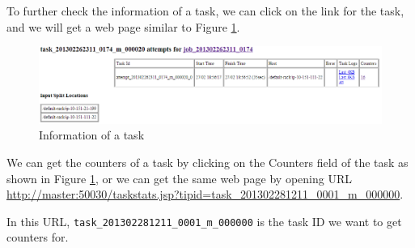 To further check the information of a task, we can click on the link for the task, and we will get a web page similar to Figure \ref{fig:task.info}.
\begin{figure}[ht]
  \centering
  \includegraphics[width=.7\textwidth]{figs/5163os_04_04.png}
  \caption{Information of a task}\label{fig:task.info}
\end{figure} 
We can get the counters of a task by clicking on the Counters field of the task as shown in Figure \ref{fig:task.info}, or we can get the same web page by opening URL \url{http://master:50030/taskstats.jsp?tipid=task_201302281211_0001_m_000000}.

In this URL, \verb|task_201302281211_0001_m_000000| is the task ID we want to get counters for.

